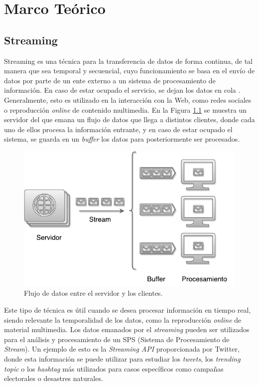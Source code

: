 \chapter{Marco Teórico}
\label{cap:marcoTeorico}

\section{Streaming}
\label{sec:streaming}

Streaming es una técnica para la transferencia de datos de forma continua, de tal manera que sea temporal y secuencial, cuyo funcionamiento se basa en el envío de datos por parte de un ente externo a un sistema de procesamiento de información. \normalsize{En caso} de estar ocupado el servicio, se dejan los datos en cola \citep{Menin2002SMH}. Generalmente, esto es utilizado en la interacción con la Web, como redes sociales o reproducción \textit{online} de contenido multimedia. En la Figura \ref{fig:streaming} se muestra un servidor \normalsize{del} que emana un flujo de datos que llega a distintos clientes, donde cada uno de ellos procesa la información entrante, y en caso de estar ocupado el sistema, se guarda en un \textit{buffer} los datos para posteriormente ser procesados.

\begin{figure}[ht!]
  \centering
    \includegraphics[scale=0.7]{images/Streaming.pdf}
  \caption{Flujo de datos entre el servidor y los clientes.}
  \label{fig:streaming}
\end{figure}

Este tipo de técnica es útil cuando se desea procesar información en tiempo real, siendo relevante la temporalidad de los datos, como la reproducción \textit{online} de material multimedia. Los datos emanados por el \textit{streaming} pueden ser utilizados para el análisis y procesamiento de un SPS (Sistema de Procesamiento de \textit{Stream}). Un ejemplo de esto es la \textit{Streaming API} proporcionada por Twitter, donde esta información se puede utilizar para estudiar los \textit{tweets}, los \textit{trending topic} o los \textit{hashtag} más utilizados para casos específicos como campañas electorales o desastres naturales.

